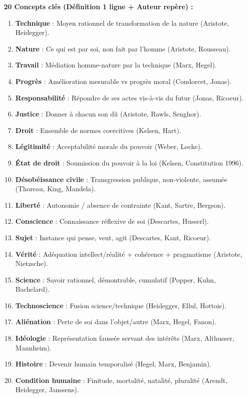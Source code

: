 \documentclass[11pt]{article}
\begin{document}
\begin{exemplebox}
\textbf{20 Concepts clés (Définition 1 ligne + Auteur repère) :}
\begin{enumerate}
\item \textbf{Technique} : Moyen rationnel de transformation de la nature (Aristote, Heidegger).
\item \textbf{Nature} : Ce qui est par soi, non fait par l'homme (Aristote, Rousseau).
\item \textbf{Travail} : Médiation homme-nature par la technique (Marx, Hegel).
\item \textbf{Progrès} : Amélioration mesurable vs progrès moral (Condorcet, Jonas).
\item \textbf{Responsabilité} : Répondre de ses actes vis-à-vis du futur (Jonas, Ricoeur).
\item \textbf{Justice} : Donner à chacun son dû (Aristote, Rawls, Senghor).
\item \textbf{Droit} : Ensemble de normes coercitives (Kelsen, Hart).
\item \textbf{Légitimité} : Acceptabilité morale du pouvoir (Weber, Locke).
\item \textbf{État de droit} : Soumission du pouvoir à la loi (Kelsen, Constitution 1996).
\item \textbf{Désobéissance civile} : Transgression publique, non-violente, assumée (Thoreau, King, Mandela).
\item \textbf{Liberté} : Autonomie / absence de contrainte (Kant, Sartre, Bergson).
\item \textbf{Conscience} : Connaissance réflexive de soi (Descartes, Husserl).
\item \textbf{Sujet} : Instance qui pense, veut, agit (Descartes, Kant, Ricoeur).
\item \textbf{Vérité} : Adéquation intellect/réalité + cohérence + pragmatisme (Aristote, Nietzsche).
\item \textbf{Science} : Savoir rationnel, démontrable, cumulatif (Popper, Kuhn, Bachelard).
\item \textbf{Technoscience} : Fusion science/technique (Heidegger, Ellul, Hottois).
\item \textbf{Aliénation} : Perte de soi dans l'objet/autre (Marx, Hegel, Fanon).
\item \textbf{Idéologie} : Représentation faussée servant des intérêts (Marx, Althusser, Mannheim).
\item \textbf{Histoire} : Devenir humain temporalisé (Hegel, Marx, Benjamin).
\item \textbf{Condition humaine} : Finitude, mortalité, natalité, pluralité (Arendt, Heidegger, Janssens).
\end{enumerate}


\end{exemplebox}
\end{document}
